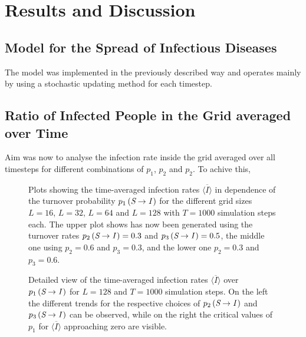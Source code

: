 \section{Results and Discussion}

\subsection{Model for the Spread of Infectious Diseases}

The model was implemented in the previously described way and operates mainly by using a stochastic updating method for each timestep.

\subsection{Ratio of Infected People in the Grid averaged over Time}

Aim was now to analyse the infection rate inside the grid averaged over all timesteps for different combinations of $p_1$, $p_2$ and $p_2$. To achive this, 


\begin{figure}[ht]
    \centering
    \resizebox{\textwidth}{!}{}
    \caption{Plots showing the time-averaged infection rates $\overline{\langle I\rangle}$ in dependence of the turnover probability $p_1\left(\textit{S}\rightarrow\textit{I}\,\right)$
    for the different grid sizes $L=16$, $L=32$, $L=64$ and $L=128$ with $T=1000$ simulation steps each. The upper plot shows has now been generated using the turnover rates $p_2\left(\textit{S}\rightarrow\textit{I}\,\right)=0.3$
    and $p_3\left(\textit{S}\rightarrow\textit{I}\,\right)=0.5$, the middle one using $p_2=0.6$ and $p_3=0.3$, and the lower one $p_2=0.3$ and $p_3=0.6$.}\label{fig:Res_Dis_Avg_Inf_over_p1}
\end{figure}


\begin{figure}[ht]
    \centering
    \resizebox{\textwidth}{!}{}
    \caption{Detailed view of the time-averaged infection rates $\overline{\langle I\rangle}$ over $p_1\left(\textit{S}\rightarrow\textit{I}\,\right)$ for $L=128$ and $T=1000$ simulation steps. On the left the different
    trends for the respective choices of $p_2\left(\textit{S}\rightarrow\textit{I}\,\right)$ and $p_3\left(\textit{S}\rightarrow\textit{I}\,\right)$ can be observed, 
    while on the right the critical values of $p_1$ for $\overline{\langle I\rangle}$ approaching zero are visible.}\label{fig:Res_Dis_Avg_Inf_over_p1_L96}
\end{figure}

